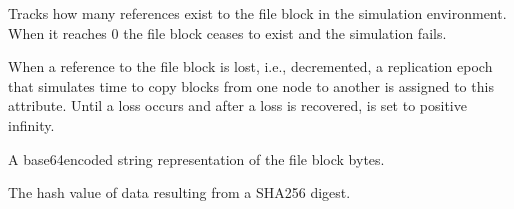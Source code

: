 \documentclass[letterpaper,10pt,english]{sphinxmanual}
\begin{document}
\begin{fulllineitems}
\begin{fulllineitems}
\end{fulllineitems}


\begin{fulllineitems}
\label{\detokenize{app.domain.helpers:app.domain.helpers.smart_dataclasses.FileBlockData.references}}
Tracks how many references exist to the file block in the
simulation environment. When it reaches 0 the file block ceases
to exist and the simulation fails.

\end{fulllineitems}


\begin{fulllineitems}
\label{\detokenize{app.domain.helpers:app.domain.helpers.smart_dataclasses.FileBlockData.replication_epoch}}
When a reference to the file block is lost, i.e., decremented,
a replication epoch that simulates time to copy blocks from one
node to another is assigned to this attribute.
Until a loss occurs and after a loss is recovered,
 is set to positive infinity.

\end{fulllineitems}


\begin{fulllineitems}
\label{\detokenize{app.domain.helpers:app.domain.helpers.smart_dataclasses.FileBlockData.data}}
A base64\sphinxhyphen{}encoded string representation of the file block bytes.

\end{fulllineitems}


\begin{fulllineitems}
\label{\detokenize{app.domain.helpers:app.domain.helpers.smart_dataclasses.FileBlockData.sha256}}
The hash value of data resulting from a SHA256 digest.


\end{fulllineitems}
\end{fulllineitems}
\end{document}
